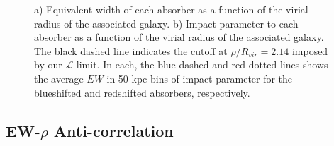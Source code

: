 \documentclass[twocolumn,tighten]{aastex6}
\begin{document}
\begin{figure}[ht]
\centering
{}
\caption{\small{a) Equivalent width of each absorber as a function of the virial radius of the associated galaxy. b) Impact parameter to each absorber as a function of the virial radius of the associated galaxy. The black dashed line indicates the cutoff at $\rho/R_{vir} =2.14$ imposed by our $\mathcal{L}$ limit.} In each, the blue-dashed and red-dotted lines shows the average $EW$ in 50 kpc bins of impact parameter for the blueshifted and redshifted absorbers, respectively. }
\vspace{5pt}
\end{figure}


\vspace{10pt}


\subsection{EW-$\rho$ Anti-correlation}
\label{ew}
\end{document}
